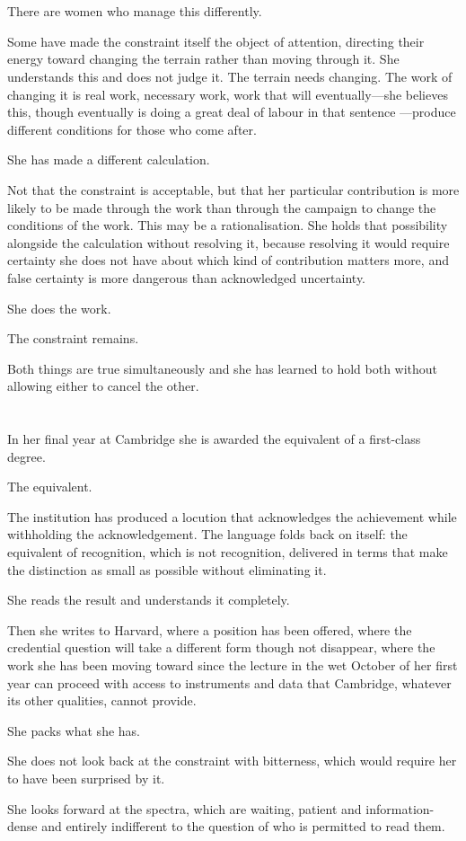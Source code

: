 \section{}

There are women who manage this differently.

Some have made the constraint itself the object
of attention, directing their energy toward
changing the terrain rather than moving through
it. She understands this and does not judge it.
The terrain needs changing. The work of changing
it is real work, necessary work, work that will
eventually---she believes this, though eventually
is doing a great deal of labour in that sentence
---produce different conditions for those who
come after.

She has made a different calculation.

Not that the constraint is acceptable, but that
her particular contribution is more likely to be
made through the work than through the campaign
to change the conditions of the work. This may
be a rationalisation. She holds that possibility
alongside the calculation without resolving it,
because resolving it would require certainty she
does not have about which kind of contribution
matters more, and false certainty is more
dangerous than acknowledged uncertainty.

She does the work.

The constraint remains.

Both things are true simultaneously and she has
learned to hold both without allowing either to
cancel the other.

\section{}

In her final year at Cambridge she is awarded
the equivalent of a first-class degree.

The equivalent.

The institution has produced a locution that
acknowledges the achievement while withholding
the acknowledgement. The language folds back
on itself: the equivalent of recognition, which
is not recognition, delivered in terms that
make the distinction as small as possible without
eliminating it.

She reads the result and understands it completely.

Then she writes to Harvard, where a position
has been offered, where the credential question
will take a different form though not disappear,
where the work she has been moving toward since
the lecture in the wet October of her first year
can proceed with access to instruments and data
that Cambridge, whatever its other qualities,
cannot provide.

She packs what she has.

She does not look back at the constraint with
bitterness, which would require her to have
been surprised by it.

She looks forward at the spectra, which are
waiting, patient and information-dense and
entirely indifferent to the question of who
is permitted to read them.

